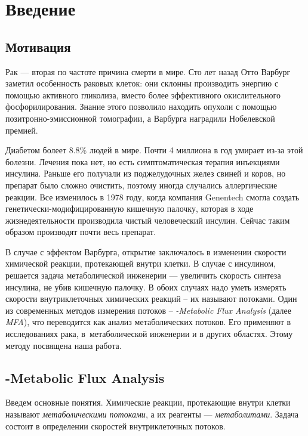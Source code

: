 \documentclass[a4paper, 12pt, left=30mm, right=15mm, top=20mm, bottom=20mm]{report}
\begin{document}
\tableofcontents

\chapter{Введение}
\section{Мотивация}
Рак --- вторая по частоте причина смерти в мире\cite{Cancer_statistics}. Сто лет назад Отто Варбург заметил\cite{Warburg_effect} особенность раковых клеток: они склонны производить энергию с помощью активного гликолиза, вместо более эффективного окислительного фосфорилирования. Знание этого позволило находить опухоли с помощью позитронно-эмиссионной томографии, а Варбурга наградили Нобелевской премией.

Диабетом болеет 8.8\% людей в мире\cite{Diabetes_statistics}. Почти 4 миллиона в год умирает из-за этой болезни. Лечения пока нет, но есть симптоматическая терапия инъекциями инсулина. Раньше его получали из поджелудочных желез свиней и коров, но препарат было сложно очистить, поэтому иногда случались аллергические реакции. Все изменилось в 1978 году, когда компания Genentech смогла создать генетически-модифицированную кишечную палочку, которая в ходе жизнедеятельности производила чистый человеческий инсулин\cite{Genentech_paper}. Сейчас таким образом производят почти весь препарат.

В случае с эффектом Варбурга, открытие заключалось в изменении скорости химической реакции, протекающей внутри клетки. В случае с инсулином, решается задача метаболической инженерии --- увеличить скорость синтеза инсулина, не убив кишечную палочку. В обоих случаях надо уметь измерять скорости внутриклеточных химических реакций -- их называют потоками. Один из современных методов измерения потоков -- \emph{-Metabolic Flux Analysis} (далее \emph{MFA}), что переводится как анализ метаболических потоков. Его применяют в исследованиях рака\cite{Application_cancer_2009, Application_cancer_2012, Application_cancer_2013, Application_cancer_2015, Application_cancer_2017, Application_cancer_2018, Application_cancer_2018_2}, в~метаболической инженерии\cite{Application_engeneering_2009, Application_engeneering_2015, Application_engeneering_2017} и в других областях\cite{Application_other_2011, Application_other_2013, Application_other_2014}. Этому методу посвящена наша работа.

\section{-Metabolic Flux Analysis}
Введем основные понятия. Химические реакции, протекающие внутри клетки называют \emph{метаболическими потоками}, а их реагенты --- \emph{метаболитами}. Задача состоит в определении скоростей внутриклеточных потоков. 
\end{document}
